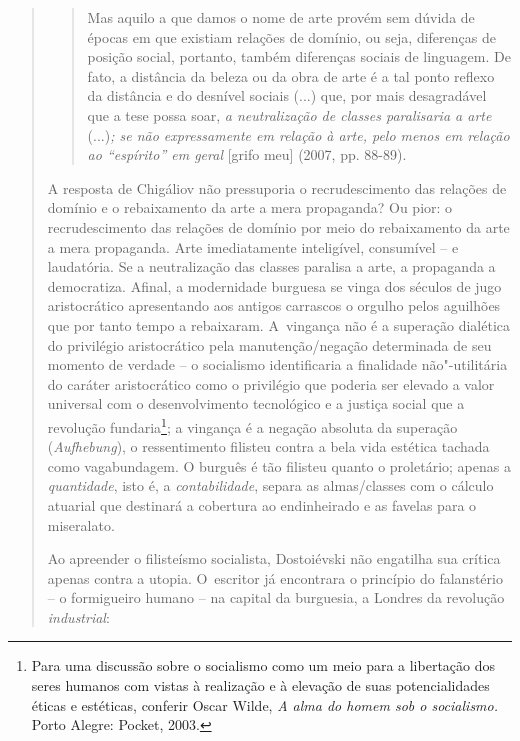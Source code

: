 {\begin{quote}
\begin{quote}
Mas aquilo a que damos o nome de arte provém sem dúvida de épocas em que
existiam relações de domínio, ou seja, diferenças de posição social,
portanto, também diferenças sociais de linguagem. De fato, a distância
da beleza ou da obra de arte é a tal ponto reflexo da distância e do
desnível sociais (...) que, por mais desagradável que a tese possa soar,
\emph{a neutralização de classes paralisaria a arte} (...)\emph{; se não
expressamente em relação à arte, pelo menos em relação ao ``espírito''
em geral} {[}grifo meu{]} (2007, pp. 88-89).
\end{quote}

A resposta de Chigáliov não pressuporia o recrudescimento das relações
de domínio e o rebaixamento da arte a mera propaganda? Ou pior: o
recrudescimento das relações de domínio por meio do rebaixamento da arte
a mera propaganda. Arte imediatamente inteligível, consumível -- e
laudatória. Se a neutralização das classes paralisa a arte, a propaganda
a democratiza. Afinal, a modernidade burguesa se vinga dos séculos de
jugo aristocrático apresentando aos antigos carrascos o orgulho pelos
aguilhões que por tanto tempo a rebaixaram. A~vingança não é a superação
dialética do privilégio aristocrático pela manutenção/negação
determinada de seu momento de verdade -- o socialismo identificaria a
finalidade não"-utilitária do caráter aristocrático como o privilégio que
poderia ser elevado a valor universal com o desenvolvimento tecnológico
e a justiça social que a revolução fundaria\footnote{Para uma discussão
  sobre o socialismo como um meio para a libertação dos seres humanos
  com vistas à realização e à elevação de suas potencialidades éticas e
  estéticas, conferir Oscar Wilde, \emph{A alma do homem sob o
  socialismo.} Porto Alegre:  Pocket, 2003.}; a vingança é a
negação absoluta da superação (\emph{Aufhebung}), o ressentimento
filisteu contra a bela vida estética tachada como vagabundagem. O
burguês é tão filisteu quanto o proletário; apenas a \emph{quantidade},
isto é, a \emph{contabilidade}, separa as almas/classes com o cálculo
atuarial que destinará a cobertura ao endinheirado e as favelas para o
miseralato.

Ao apreender o filisteísmo socialista, Dostoiévski não engatilha sua
crítica apenas contra a utopia. O~escritor já encontrara o princípio do
falanstério -- o formigueiro humano -- na capital da burguesia, a
Londres da revolução \emph{industrial}:


\end{quote}}
